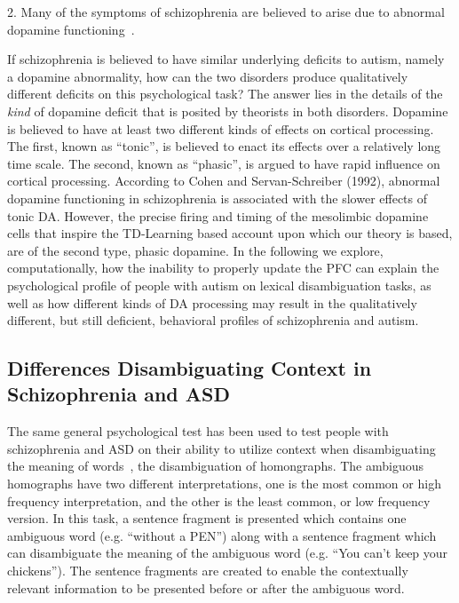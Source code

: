 2.  Many of the symptoms of schizophrenia are believed to arise due to abnormal dopamine functioning~\cite{CohenJD:1992:Schizophrenia}.  

If schizophrenia is believed to have similar underlying deficits to autism, namely a dopamine abnormality, how can the two disorders produce qualitatively different deficits on this psychological task?  The answer lies in the details of the \emph{kind} of dopamine deficit that is posited by theorists in both disorders.  Dopamine is believed to have at least two different kinds of effects on cortical processing.  The first, known as ``tonic'', is believed to enact its effects over a relatively long time scale.  The second, known as ``phasic'', is argued to have rapid influence on cortical processing.  According to Cohen and Servan-Schreiber (1992), abnormal dopamine functioning in schizophrenia is associated with the slower effects of tonic DA.  However, the precise firing and timing of the mesolimbic dopamine cells that inspire the TD-Learning based account upon which our theory is based, are of the second type, phasic dopamine.  In the following we explore, computationally, how the inability to properly update the PFC can explain the psychological profile of people with autism on lexical disambiguation tasks, as well as how different kinds of DA processing may result in the qualitatively different, but still deficient, behavioral profiles of schizophrenia and autism. 

\subsection{Differences Disambiguating Context in Schizophrenia and ASD}
The same general psychological test has been used to test people with schizophrenia and ASD on their ability to utilize context when disambiguating the meaning of words~\cite{CohenJD:1992:Schizophrenia,RefWorks:103,HappeF:1997:WCC_Homographs}, the disambiguation of homongraphs. The ambiguous homographs have two different interpretations, one is the most common or high frequency interpretation, and the other is the least common, or low frequency version.  In this task, a sentence fragment is presented which contains one ambiguous word (e.g. ``without a PEN'') along with a sentence fragment which can disambiguate the meaning of the ambiguous word (e.g. ``You can't keep your chickens'').  The sentence fragments are created to enable the contextually relevant information to be presented before or after the ambiguous word.

